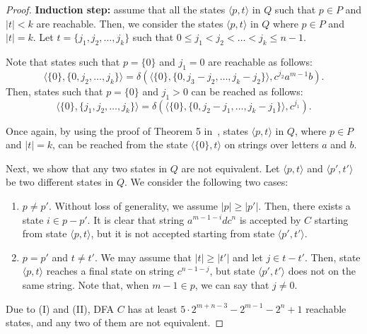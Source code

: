 \documentclass[10pt]{article}
\begin{document}
\begin{proof}
    {\bf Induction step:} assume that all the states $\langle p, t\rangle$ in $Q$ such that $p \in P$ and $|t| < k$ are reachable.
    Then, we consider the states $\langle p, t\rangle$ in $Q$ where $p \in P$ and $|t| = k$.
    Let $t = \{j_1, j_2, \ldots, j_k\}$ such that $0 \le j_1 < j_2 < \ldots < j_k \le n-1$.

    Note that states such that $p = \{0\}$ and $j_1 = 0$ are reachable as follows:
\[
    \langle \{0\}, \{0, j_2, \ldots, j_k\}\rangle = \delta( \langle \{0\}, \{0, j_3 - j_2, \ldots, j_k - j_2 \}\rangle, c^{j_2}a^{m-1}b).
\]
Then, states such that $p = \{0\}$ and $j_1 > 0$ can be reached as follows:
\[
    \langle \{0\}, \{j_1, j_2, \ldots, j_k\}\rangle = \delta(\langle \{0\}, \{0, j_2 - j_1, \ldots, j_k - j_1\}\rangle, c^{j_1}).
\]

Once again, by using the proof of Theorem 5 in~\cite{YuZhSa94}, states $\langle p, t\rangle$ in $Q$, where $p \in P$ and $|t| = k$, can be reached from the state $\langle \{0\}, t \rangle$ on strings over letters $a$ and $b$.

Next, we show that any two states in $Q$ are not equivalent.
Let $\langle p, t\rangle$ and $\langle p', t' \rangle$ be two different states in $Q$.
We consider the following two cases:
\begin{enumerate}
\item $p \neq p'$.
Without loss of generality, we assume $|p| \ge |p'|$.
Then, there exists a state $ i \in p - p'$.
It is clear that string $a^{m-1-i}dc^n$ is accepted by $C$ starting from state $\langle p, t\rangle$, but it is not accepted starting from state $\langle p', t' \rangle$.

\item $p = p'$ and $t \neq t'$.
We may assume that $|t| \ge |t'|$ and let $j \in t-t'$.
Then, state $\langle p, t \rangle$ reaches a final state on string $c^{n-1-j}$, but state $\langle p', t' \rangle$ does not on the same string.
Note that, when $m-1 \in p$, we can say that $j \neq 0$.
\end{enumerate}

Due to (I) and (II), DFA $C$ has at least $5 \cdot 2^{m+n-3} - 2^{m-1} - 2^n +1$ reachable states, and any two of them are not equivalent.
\end{proof}
\end{document}

